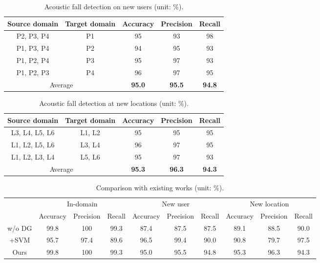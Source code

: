 \documentclass[journal]{IEEEtran}
\begin{document}
\begin{table}
		\footnotesize
    \caption{Acoustic fall detection on new users (unit: \%).}
    \label{TblAcousticUser}
    \centering
    \begin{tabular}{ccccc}
    \hline
        Source domain & Target domain & Accuracy & Precision & Recall \\ \hline
        P2, P3, P4 		& P1 						& 95 	& 93 	& 98 \\ 
        P1, P3, P4 		& P2 						& 94 	& 95 	& 93 \\ 
        P1, P2, P4 		& P3 						& 95 	& 97 	& 93 \\ 
        P1, P2, P3 		& P4 						& 96 	& 97 	& 95 \\ \hline
        \multicolumn{2}{c}{Average} 	& \textbf{95.0} 	& \textbf{95.5} 	& \textbf{94.8} \\ \hline
    \end{tabular}
\end{table}

\begin{table}
    \centering
		\footnotesize
    \caption{Acoustic fall detection at new locations (unit: \%).}
    \begin{tabular}{ccccc}
    \hline
        Source domain 	& Target domain & Accuracy & Precision 	& Recall \\ \hline
        L3, L4, L5, L6 	& L1, L2				& 95 		& 95 		& 95 \\
        L1, L2, L5, L6 	& L3, L4				& 96 		& 97 		& 95 \\ 
        L1, L2, L3, L4 	& L5, L6				& 95 		& 97 		& 93 \\  \hline
        \multicolumn{2}{c}{Average}			& \textbf{95.3} 	& \textbf{96.3} 	& \textbf{94.3} \\	\hline
    \end{tabular}
    \label{TblAcousticLocation}
\end{table}

\begin{table*}
    \centering
		\footnotesize
    \caption{Comparison with existing works (unit: \%).}
    \begin{tabular}{c|ccc|ccc|ccc}
    \hline
										& \multicolumn{3}{|c|}{In-domain} & \multicolumn{3}{|c|}{New user} 	& \multicolumn{3}{|c}{New location}  \\ 
										& Accuracy & Precision & Recall 	& Accuracy & Precision & Recall & Accuracy & Precision & Recall 		\\ \hline
		w/o DG  											& 99.8 & 100 	& 99.3 		& 87.4 & 87.5 & 87.5			& 89.1 & 88.5 & 90.0  \\
    \cite{LianJ:2021}+SVM					& 95.7 & 97.4 & 89.6		& 96.5 & 99.4 & 90.0 			& 90.8 & 79.7 & 97.5 \\ 
    Ours													& 99.8 & 100 	& 99.3		& 95.0 & 95.5 & 94.8			& 95.3 & 96.3	& 94.3  \\  \hline
    \end{tabular}
    \label{TblAcousticComp}
\end{table*}
\end{document}
